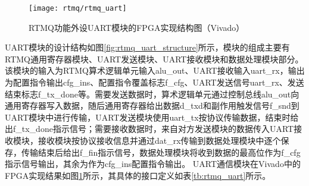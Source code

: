 \begin{figure}
    \centering
    \texttt{[image: rtmq/rtmq\_uart]}
    \caption[RTMQ功能外设UART模块的FPGA实现结构图]{RTMQ功能外设UART模块的FPGA实现结构图（Vivado）\label{fig:rtmq_uart}}
\end{figure}



UART模块的设计结构如图\ref{fig:rtmq_uart_structure}所示，模块的组成主要有RTMQ通用寄存器模块、UART发送模块、UART接收模块和数据处理模块部分。
该模块的输入为RTMQ算术逻辑单元输入alu\_out、UART接收输入uart\_rx，输出为配置指令输出cfg\_ins、配置指令覆盖标志f\_cfg、UART发送信号uart\_rx、发送结束标志f\_tx\_done等。需要发送数据时，算术逻辑单元通过控制总线alu\_out向通用寄存器写入数据，随后通用寄存器给出数据d\_txd和副作用触发信号f\_snd到UART模块中进行传输，UART发送模块使用uart\_tx按协议传输数据，结束时给出f\_tx\_done指示信号；需要接收数据时，来自对方发送模块的数据传入UART接收模块，接收模块按协议接收信息并通过dat\_rx传输到数据处理模块中逐个保存，传输结束后给出f\_fin指示信号，数据处理模块将收到数据的最高位作为f\_cfg指示信号输出，其余为作为cfg\_ins配置指令输出。
UART通信模块在Vivado中的FPGA实现结果如图\ref{fig:rtmq_uart}所示，其具体的接口定义如表\ref{tb:rtmq_uart}所示。






